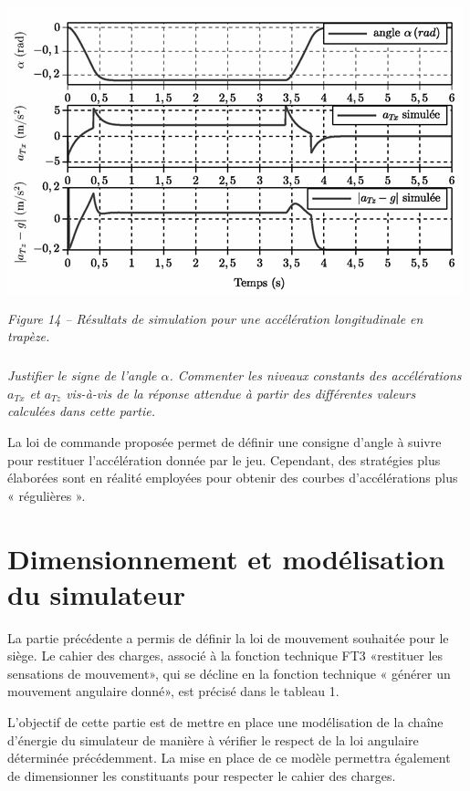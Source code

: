 \documentclass[10pt,fleqn]{article} %
\begin{document}
\begin{center}
\includegraphics[width=.9\linewidth]{images/fig_14}

\textit{Figure 14 -- Résultats de simulation pour une accélération longitudinale en trapèze.}
\end{center}

\subparagraph{}\textit{Justifier le signe de l'angle $\alpha$. Commenter les niveaux constants des accélérations $a_{Tx}$ et $a_{Tz}$ vis-à-vis de la réponse attendue à partir des différentes valeurs calculées dans cette partie.}

La loi de commande proposée permet de définir une consigne d'angle à suivre pour restituer l'accélération donnée par le jeu. Cependant, des stratégies plus élaborées sont en réalité employées pour obtenir des courbes d'accélérations plus « régulières ». 

\section{Dimensionnement et modélisation du simulateur \label{sec_4}}
La partie précédente a permis de définir la loi de mouvement souhaitée pour le siège. Le cahier des charges, associé à la fonction technique FT3 «restituer les sensations de mouvement», qui se décline en la fonction technique « générer un mouvement angulaire donné», est précisé dans le tableau 1. 

\begin{obj}
L'objectif de cette partie est de mettre en place une modélisation de la chaîne d'énergie du simulateur de manière à vérifier le respect de la loi angulaire déterminée précédemment. La mise en place de ce modèle permettra également de dimensionner les constituants pour respecter le cahier des charges. 
\end{obj}
\end{document}
